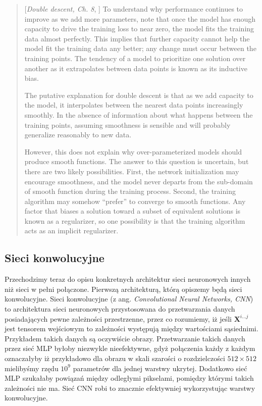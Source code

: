 \documentclass{myclass}
\numberwithin{equation}{subsection}
\begin{document}
\begin{quote}[\textit{Double descent, Ch. 8}, \cite{prince2023understanding}]
To understand why performance continues to improve as we add more parameters, note that once the
model has enough capacity to drive the training loss to near zero, the model fits the training data
almost perfectly. This implies that further capacity cannot help the model fit the training data any
better; any change must occur between the training points. The tendency of a model to prioritize one
solution over another as it extrapolates between data points is known as its inductive bias.

The putative explanation for double descent is that as we add capacity to the model, it interpolates
between the nearest data points increasingly smoothly. In the absence of information about what
happens between the training points, assuming smoothness is sensible and will probably generalize
reasonably to new data.

However, this does not explain why over-parameterized models should produce smooth functions. The
answer to this question is uncertain, but there are two likely possibilities. First, the network
initialization may encourage smoothness, and the model never departs from the sub-domain of smooth
function during the training process. Second, the training algorithm may somehow “prefer” to
converge to smooth functions. Any factor that biases a solution toward a subset of equivalent
solutions is known as a regularizer, so one possibility is that the training algorithm acts as an
implicit regularizer.
\end{quote}


\subsection{Sieci konwolucyjne}

Przechodzimy teraz do opisu konkretnych architektur sieci neuronowych innych niż sieci w pełni
połączone. Pierwszą architekturą, którą opiszemy będą sieci konwolucyjne. Sieci konwolucyjne (z ang.
\emph{Convolutional Neural Networks, CNN}) to architektura sieci neuronowych przystosowana do
przetwarzania danych posiadających pewne zależności przestrzenne, przez co rozumiemy, iż jeśli
\(\bm{X}^{i...j}\) jest tensorem wejściowym to zależności występują między wartościami sąsiednimi.
Przykładem takich danych są oczywiście obrazy. Przetwarzanie takich danych przez sieć MLP byłoby
niezwykle nieefektywne, gdyż połączenia każdy z każdym oznaczałyby iż przykładowo dla obrazu w skali
szarości o rozdzielczości \(512 \times 512\) mielibyśmy rzędu \(10^9\) parametrów dla jednej warstwy
ukrytej. Dodatkowo sieć MLP szukałaby powiązań między odległymi pikselami, pomiędzy którymi takich
zależności nie ma. Sieć CNN robi to znacznie efektywniej wykorzystując warstwy konwolucyjne. 
\end{document}
